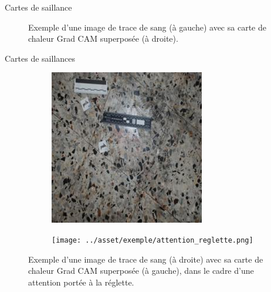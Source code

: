 \documentclass[11pt]{beamer}
\begin{document}
\begin{frame}{Cartes de saillance}
\begin{figure}[ht]
\begin{subfigure}{0.40\textwidth}
        \end{subfigure}
        \caption{Exemple d'une image  de trace de sang (à gauche) avec sa carte de chaleur Grad CAM superposée (à droite).}
        \label{fig:grad_cam_example}
    \end{figure}
\end{frame}

\begin{frame}{Cartes de saillances}
    \begin{figure}[ht]
        \centering
        \begin{subfigure}{0.40\textwidth}
            \centering
            \includegraphics[width=\linewidth]{../asset/exemple/attention_reglette_image.jpg}
        \end{subfigure}
        \begin{subfigure}{0.40\textwidth}
            \centering
            \texttt{[image: ../asset/exemple/attention\_reglette.png]}
        \end{subfigure}
        \caption{Exemple d'une image de trace de sang (à droite) avec sa carte de chaleur Grad CAM superposée (à gauche), dans le cadre d'une attention portée à la réglette.}
        \label{fig:grad_cam reglette}
    \end{figure}
\end{frame}
\end{document}
